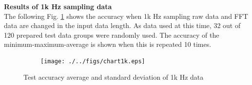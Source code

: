 \documentclass[letterpaper,  10 pt,  conference]{ieeeconf}  %
\begin{document}

%            
%            
\textbf{Results of 1k Hz sampling data}\\

The following Fig. \ref{1k_ave_stddev} shows the accuracy when 1k Hz sampling raw data and FFT data are changed in the input data length. As data used at this time,  32 out of 120 prepared test data groups were randomly used. The accuracy of the minimum-maximum-average is shown when this is repeated 10 times. \\

    \begin{figure}[thpb]
        \centering



        \texttt{[image: ./../figs/chart1k.eps]}
        \caption{
            Test accuracy average and standard deviation of 1k Hz data 
        }
        \label{1k_ave_stddev}
     \end{figure}    
\end{document}
